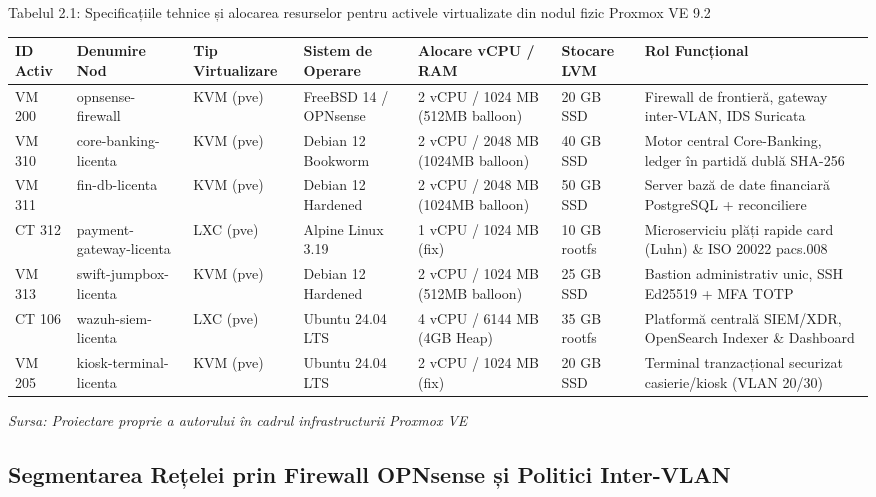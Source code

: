 Tabelul 2.1: Specificațiile tehnice și alocarea resurselor pentru activele virtualizate din nodul fizic Proxmox VE 9.2

\begin{table}[htbp]
\centering
\small
\begin{tabular}{p{} p{} p{} p{} p{} p{} p{}}
\toprule
ID Activ & Denumire Nod & Tip Virtualizare & Sistem de Operare & Alocare vCPU / RAM & Stocare LVM & Rol Funcțional \\
\midrule
VM 200 & opnsense-firewall & KVM (pve) & FreeBSD 14 / OPNsense & 2 vCPU / 1024 MB (512MB balloon) & 20 GB SSD & Firewall de frontieră, gateway inter-VLAN, IDS Suricata \\
VM 310 & core-banking-licenta & KVM (pve) & Debian 12 Bookworm & 2 vCPU / 2048 MB (1024MB balloon) & 40 GB SSD & Motor central Core-Banking, ledger în partidă dublă SHA-256 \\
VM 311 & fin-db-licenta & KVM (pve) & Debian 12 Hardened & 2 vCPU / 2048 MB (1024MB balloon) & 50 GB SSD & Server bază de date financiară PostgreSQL + reconciliere \\
CT 312 & payment-gateway-licenta & LXC (pve) & Alpine Linux 3.19 & 1 vCPU / 1024 MB (fix) & 10 GB rootfs & Microserviciu plăți rapide card (Luhn) \& ISO 20022 pacs.008 \\
VM 313 & swift-jumpbox-licenta & KVM (pve) & Debian 12 Hardened & 2 vCPU / 1024 MB (512MB balloon) & 25 GB SSD & Bastion administrativ unic, SSH Ed25519 + MFA TOTP \\
CT 106 & wazuh-siem-licenta & LXC (pve) & Ubuntu 24.04 LTS & 4 vCPU / 6144 MB (4GB Heap) & 35 GB rootfs & Platformă centrală SIEM/XDR, OpenSearch Indexer \& Dashboard \\
VM 205 & kiosk-terminal-licenta & KVM (pve) & Ubuntu 24.04 LTS & 2 vCPU / 1024 MB (fix) & 20 GB SSD & Terminal tranzacțional securizat casierie/kiosk (VLAN 20/30) \\
\bottomrule
\end{tabular}
\end{table}

\textit{Sursa: Proiectare proprie a autorului în cadrul infrastructurii Proxmox VE}

\subsection{Segmentarea Rețelei prin Firewall OPNsense și Politici Inter-VLAN}

